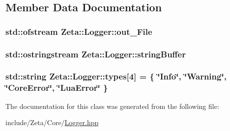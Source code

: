 \subsection{Member Data Documentation}
\hypertarget{classZeta_1_1Logger_ac3dd593d966ebf8f8be09b8e0acb1665}{
\subsubsection[{out\+\_\+\+File}]{\setlength{\rightskip}{0pt plus 5cm}std\+::ofstream Zeta\+::\+Logger\+::out\+\_\+\+File\hspace{0.3cm}{\ttfamily [private]}}}\label{classZeta_1_1Logger_ac3dd593d966ebf8f8be09b8e0acb1665}
\hypertarget{classZeta_1_1Logger_a23cc893d82b06f5e3196d34fe555ec46}{
\subsubsection[{string\+Buffer}]{\setlength{\rightskip}{0pt plus 5cm}std\+::ostringstream Zeta\+::\+Logger\+::string\+Buffer\hspace{0.3cm}{\ttfamily [private]}}}\label{classZeta_1_1Logger_a23cc893d82b06f5e3196d34fe555ec46}
\hypertarget{classZeta_1_1Logger_ac458dd40dd985abdcdc0b23af80f3e6f}{
\subsubsection[{types}]{\setlength{\rightskip}{0pt plus 5cm}std\+::string Zeta\+::\+Logger\+::types\mbox{[}4\mbox{]} = \{ \char`\"{}Info\char`\"{}, \char`\"{}Warning\char`\"{}, \char`\"{}Core\+Error\char`\"{}, \char`\"{}Lua\+Error\char`\"{} \}\hspace{0.3cm}{\ttfamily [private]}}}\label{classZeta_1_1Logger_ac458dd40dd985abdcdc0b23af80f3e6f}


The documentation for this class was generated from the following file\+:\begin{DoxyCompactItemize}
\item 
include/\+Zeta/\+Core/\hyperlink{Logger_8hpp}{Logger.\+hpp}\end{DoxyCompactItemize}
